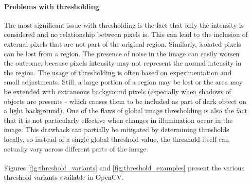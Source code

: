 \paragraph{Problems with thresholding}
The most significant issue with thresholding is the fact that only the intensity is considered and no relationship between pixels is. This can lead to the inclusion of external pixels that are not part of the original region. Similarly, isolated pixels can be lost from a region. The presence of noise in the image can easily worsen the outcome, because pixels intensity may not represent the normal intensity in the region. The usage of thresholding is often based on experimentation and small adjustments. Still, a large portion of a region may be lost or the area may be extended with extraneous background pixels (especially when shadows of objects are presents - which causes them to be included as part of dark object on a light background). One of the flaws of global image thresholding is also the fact that it is not particularly effective when changes in illumination occur in the image. This drawback can partially be mitigated by determining thresholds locally, so instead of a single global threshold value, the threshold itself can actually vary across different parts of the image.

\paragraph{}
Figures \ref{fig:threshold_variants} and \ref{fig:threshold_examples} present the various threshold variants available in OpenCV.

